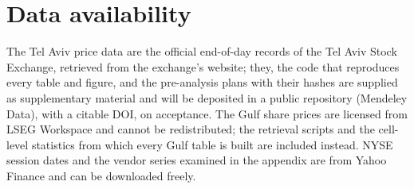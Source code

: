 \documentclass[preprint,12pt]{elsarticle}
\begin{document}
\section*{Data availability}
The Tel Aviv price data are the official end-of-day records of the Tel Aviv Stock Exchange, retrieved from the exchange's website; they, the code that reproduces every table and figure, and the pre-analysis plans with their hashes are supplied as supplementary material and will be deposited in a public repository (Mendeley Data), with a citable DOI, on acceptance. The Gulf share prices are licensed from LSEG Workspace and cannot be redistributed; the retrieval scripts and the cell-level statistics from which every Gulf table is built are included instead. NYSE session dates and the vendor series examined in the appendix are from Yahoo Finance and can be downloaded freely.



\end{document}
